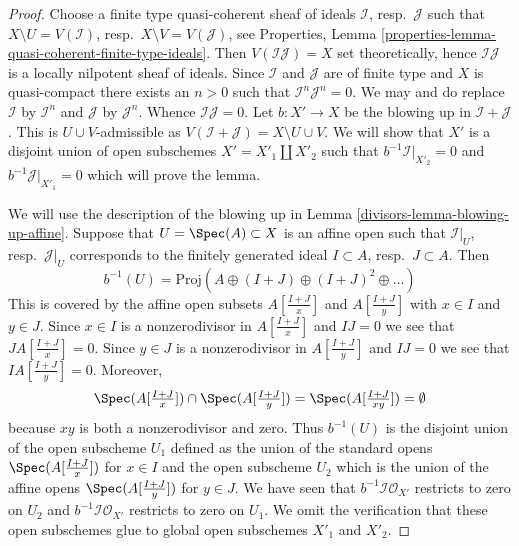 \begin{proof}

Choose a finite type quasi-coherent sheaf of ideals $\mathcal{I}$,
resp.\ $\mathcal{J}$ such that $X \setminus U = V(\mathcal{I})$,
resp.\ $X \setminus V = V(\mathcal{J})$, see
Properties, Lemma \ref{properties-lemma-quasi-coherent-finite-type-ideals}.
Then $V(\mathcal{I}\mathcal{J}) = X$ set theoretically, hence
$\mathcal{I}\mathcal{J}$ is a locally nilpotent sheaf of ideals.
Since $\mathcal{I}$ and $\mathcal{J}$ are of finite type and $X$
is quasi-compact there exists an $n > 0$ such that
$\mathcal{I}^n \mathcal{J}^n = 0$. We may and do replace $\mathcal{I}$
by $\mathcal{I}^n$ and $\mathcal{J}$ by $\mathcal{J}^n$. Whence
$\mathcal{I} \mathcal{J} = 0$. Let $b : X' \to X$ be the blowing
up in $\mathcal{I} + \mathcal{J}$. This is $U \cup V$-admissible
as $V(\mathcal{I} + \mathcal{J}) = X \setminus U \cup V$. We will show that
$X'$ is a disjoint union of open subschemes $X' = X'_1 \amalg X'_2$
such that $b^{-1}\mathcal{I}|_{X'_2} = 0$ and $b^{-1}\mathcal{J}|_{X'_1} = 0$
which will prove the lemma.

\medskip\noindent
We will use the description of the blowing up in
Lemma \ref{divisors-lemma-blowing-up-affine}. Suppose that $U = \Spec(A) \subset X$
is an affine open such that $\mathcal{I}|_U$, resp.\ $\mathcal{J}|_U$
corresponds to the finitely generated ideal $I \subset A$, resp.\ $J \subset A$.
Then
$$
b^{-1}(U) = \text{Proj}(A \oplus (I + J) \oplus (I + J)^2 \oplus \ldots)
$$
This is covered by the affine open subsets $A[\frac{I + J}{x}]$
and $A[\frac{I + J}{y}]$ with $x \in I$ and $y \in J$. Since $x \in I$ is a
nonzerodivisor in $A[\frac{I + J}{x}]$ and $IJ = 0$ we see that
$J A[\frac{I + J}{x}] = 0$. Since $y \in J$ is a nonzerodivisor
in $A[\frac{I + J}{y}]$ and $IJ = 0$ we see that
$I A[\frac{I + J}{y}] = 0$. Moreover,
$$
\Spec(A[\textstyle{\frac{I + J}{x}}]) \cap
\Spec(A[\textstyle{\frac{I + J}{y}}]) =
\Spec(A[\textstyle{\frac{I + J}{xy}}]) = \emptyset
$$
because $xy$ is both a nonzerodivisor and zero. Thus $b^{-1}(U)$
is the disjoint union of the open subscheme $U_1$ defined as the union
of the standard opens $\Spec(A[\frac{I + J}{x}])$ for $x \in I$ and the open
subscheme $U_2$ which is the union of the affine opens
$\Spec(A[\frac{I + J}{y}])$ for $y \in J$. We have seen that
$b^{-1}\mathcal{I}\mathcal{O}_{X'}$ restricts to zero on $U_2$
and $b^{-1}\mathcal{I}\mathcal{O}_{X'}$ restricts to zero on $U_1$.
We omit the verification that these open subschemes glue to global
open subschemes $X'_1$ and $X'_2$.
\end{proof}

